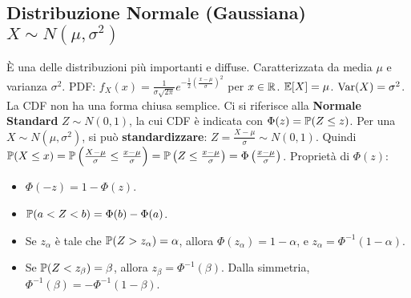 \documentclass[12pt,a4paper]{article}
\begin{document}
\begin{example}
\subsection{Distribuzione Normale (Gaussiana) \texorpdfstring{$X \sim N(\mu, \sigma^2)$}{X ~ N(mu, sigma^2)}}
È una delle distribuzioni più importanti e diffuse. Caratterizzata da media $\mu$ e varianza $\sigma^2$.
PDF: $f_X(x) = \frac{1}{\sigma\sqrt{2\pi}} e^{-\frac{1}{2}\left(\frac{x-\mu}{\sigma}\right)^2}$ per $x \in \mathbb{R}$.
$\mathbb{E}[X] = \mu$.
$\mathrm{Var}(X) = \sigma^2$.
La CDF non ha una forma chiusa semplice. Ci si riferisce alla \textbf{Normale Standard} $Z \sim N(0,1)$, la cui CDF è indicata con $\Phi(z) = \mathbb{P}(Z \le z)$.
Per una $X \sim N(\mu, \sigma^2)$, si può \textbf{standardizzare}: $Z = \frac{X-\mu}{\sigma} \sim N(0,1)$.
Quindi $\mathbb{P}(X \le x) = \mathbb{P}\left(\frac{X-\mu}{\sigma} \le \frac{x-\mu}{\sigma}\right) = \mathbb{P}\left(Z \le \frac{x-\mu}{\sigma}\right) = \Phi\left(\frac{x-\mu}{\sigma}\right)$.
Proprietà di $\Phi(z)$:
\begin{itemize}
    \item $\Phi(-z) = 1 - \Phi(z)$.
    \item $\mathbb{P}(a < Z < b) = \Phi(b) - \Phi(a)$.
    \item Se $z_\alpha$ è tale che $\mathbb{P}(Z > z_\alpha) = \alpha$, allora $\Phi(z_\alpha)=1-\alpha$, e $z_\alpha = \Phi^{-1}(1-\alpha)$.
    \item Se $\mathbb{P}(Z < z_\beta) = \beta$, allora $z_\beta = \Phi^{-1}(\beta)$. Dalla simmetria, $\Phi^{-1}(\beta) = -\Phi^{-1}(1-\beta)$.
\end{itemize}


\end{example}
\end{document}
